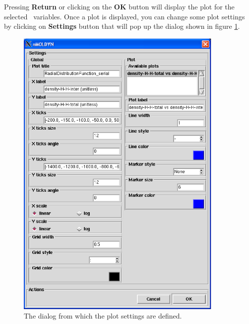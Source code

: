 \documentclass[a4paper,11pt]{report}
\begin{document}
\begin{itemize}
Pressing \textbf{Return} or clicking on the \textbf{OK} button will display the plot for the selected \NetCDF\ variables. Once a plot is 
displayed, you can change some plot settings by clicking on \textbf{Settings} button that will pop up the dialog 
shown in figure \ref{fig:plot_settings}. 
\begin{figure}[h!]
\begin{center}
\includegraphics[width=10cm]{Figures/plot_settings.eps}
\end{center}
\caption[The plot settings dialog]{The dialog from which the plot settings are defined.}
\label{fig:plot_settings}
\end{figure}   


\end{itemize}
\end{document}
